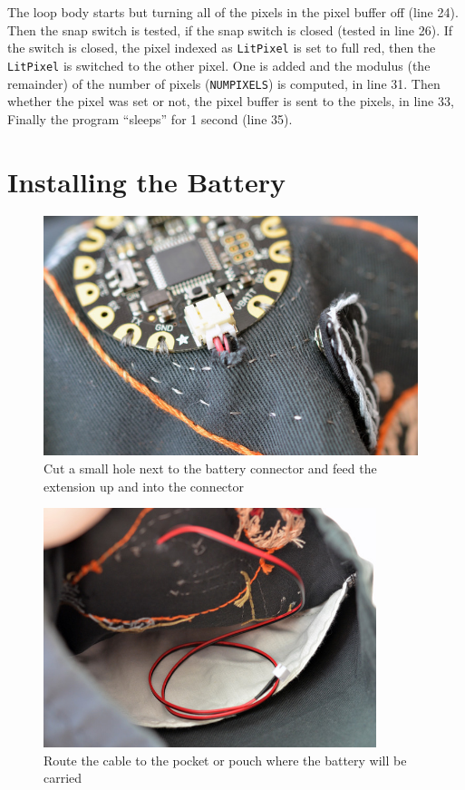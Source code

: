\documentclass[letterpaper,twoside,12pt]{article}
\begin{document}
The loop body starts but turning all of the pixels in the pixel buffer off
(line 24). Then the snap switch is tested, if the snap switch is closed
(tested in line 26). If the switch is closed, the pixel indexed as
\texttt{LitPixel} is set to full red, then the \texttt{LitPixel} is switched
to the other pixel. One is added and the modulus (the remainder) of the number
of pixels (\texttt{NUMPIXELS}) is computed, in line 31. Then whether the
pixel was set or not, the pixel buffer is sent to the pixels, in line 33, 
Finally the program ``sleeps'' for 1 second (line 35).

\part{Installing the Battery}
\begin{figure}[hbpt]\begin{centering}%
\includegraphics[height=2.75in]{flora-angler-embroidery-28.jpg}
\caption{Cut a small hole next to the battery connector and feed the extension 
up and into the connector}
\label{fig:flora-angler-embroidery-28}
\end{centering}\end{figure}
\begin{figure}[hbpt]\begin{centering}%
\includegraphics[height=2.75in]{flora-angler-embroidery-29.jpg}
\caption{Route the cable to the pocket or pouch where the battery will be carried}
\label{fig:flora-angler-embroidery-29}
\end{centering}\end{figure}
\end{document}
